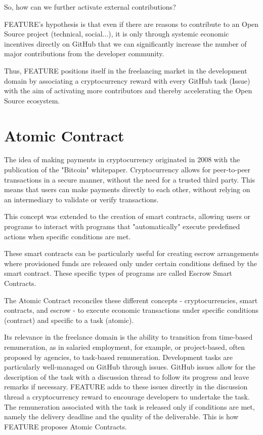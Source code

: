 \documentclass[
	a4paper, %
	10pt, %
	unnumberedsections, %
	twoside, %
]{LTJournalArticle}
\begin{document}
So, how can we further activate external contributions?

FEATURE's hypothesis is that even if there are reasons to contribute to an Open Source project (technical, social...), it is only through systemic economic incentives directly on GitHub that we can significantly increase the number of major contributions from the developer community.

Thus, FEATURE positions itself in the freelancing market in the development domain by associating a cryptocurrency reward with every GitHub task (Issue) with the aim of activating more contributors and thereby accelerating the Open Source ecosystem.


\section{Atomic Contract}

The idea of making payments in cryptocurrency originated in 2008 with the publication of the "Bitcoin" whitepaper. Cryptocurrency allows for peer-to-peer transactions in a secure manner, without the need for a trusted third party. This means that users can make payments directly to each other, without relying on an intermediary to validate or verify transactions.

This concept was extended to the creation of smart contracts, allowing users or programs to interact with programs that "automatically" execute predefined actions when specific conditions are met.

These smart contracts can be particularly useful for creating escrow arrangements where provisioned funds are released only under certain conditions defined by the smart contract. These specific types of programs are called Escrow Smart Contracts.

The Atomic Contract reconciles these different concepts - cryptocurrencies, smart contracts, and escrow - to execute economic transactions under specific conditions (contract) and specific to a task (atomic).

Its relevance in the freelance domain is the ability to transition from time-based remuneration, as in salaried employment, for example, or project-based, often proposed by agencies, to task-based remuneration. Development tasks are particularly well-managed on GitHub through issues. GitHub issues allow for the description of the task with a discussion thread to follow its progress and leave remarks if necessary. FEATURE adds to these issues directly in the discussion thread a cryptocurrency reward to encourage developers to undertake the task. The remuneration associated with the task is released only if conditions are met, namely the delivery deadline and the quality of the deliverable. This is how FEATURE proposes Atomic Contracts.
\end{document}
